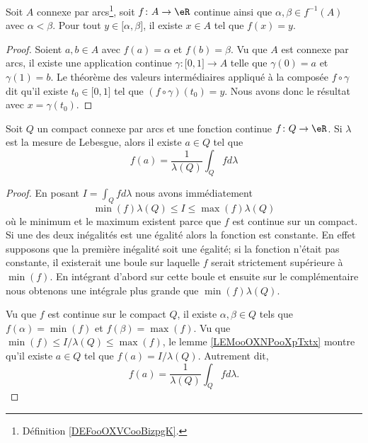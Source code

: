 \begin{lemma}        \label{LEMooOXNPooXpTxtx}
	Soit \( A\) connexe par arcs\footnote{Définition \ref{DEFooOXVCooBizpgK}.}, soit \( f\colon A\to \eR\) continue ainsi que \( \alpha,\beta\in f^{-1}(A)\) avec \( \alpha<\beta\). Pour tout \( y\in \mathopen[ \alpha , \beta \mathclose]\), il existe \( x\in A\) tel que \( f(x)=y\).
\end{lemma}

\begin{proof}
	Soient \( a,b\in A\) avec \( f(a)=\alpha\) et \( f(b)=\beta\). Vu que \( A\) est connexe par arcs, il existe une application continue \( \gamma\colon \mathopen[ 0 , 1 \mathclose]\to A\) telle que \( \gamma(0)=a\) et \( \gamma(1)=b\). Le théorème des valeurs intermédiaires appliqué à la composée \( f\circ\gamma\) dit qu'il existe \( t_0\in \mathopen[ 0 , 1 \mathclose]\) tel que \( (f\circ \gamma)(t_0)=y\). Nous avons donc le résultat avec \( x=\gamma(t_0)\).
\end{proof}

\begin{theorem}      \label{ThoooEZLGooMChwLT}
	Soit \( Q\) un compact connexe par arcs et une fonction continue \( f\colon Q\to \eR\). Si \( \lambda\) est la mesure de Lebesgue, alors il existe \( a\in Q\) tel que
	\begin{equation}
		f(a)=\frac{1}{ \lambda(Q) }\int_Qfd\lambda
	\end{equation}
\end{theorem}

\begin{proof}
	En posant \( I=\int_Qfd\lambda\) nous avons immédiatement
	\begin{equation}        \label{EqooTYQCooVxdazW}
		\min(f)\lambda(Q)\leq I\leq \max(f)\lambda(Q)
	\end{equation}
	où le minimum et le maximum existent parce que \( f\) est continue sur un compact. Si une des deux inégalités est une égalité alors la fonction est constante. En effet supposons que la première inégalité soit une égalité; si la fonction n'était pas constante, il existerait une boule sur laquelle \( f\) serait strictement supérieure à \( \min(f)\). En intégrant d'abord sur cette boule et ensuite sur le complémentaire nous obtenons une intégrale plus grande que \( \min(f)\lambda(Q)\).

	Vu que \( f\) est continue sur le compact \( Q\), il existe \( \alpha,\beta\in Q\) tels que \( f(\alpha)=\min(f)\) et \( f(\beta)=\max(f)\). Vu que \( \min(f)\leq I/\lambda(Q)\leq \max(f)\), le lemme \ref{LEMooOXNPooXpTxtx} montre qu'il existe \( a\in Q\) tel que \( f(a)=I/\lambda(Q)\). Autrement dit,
	\begin{equation}
		f(a)=\frac{1}{ \lambda(Q) }\int_Qfd\lambda.
	\end{equation}
\end{proof}

